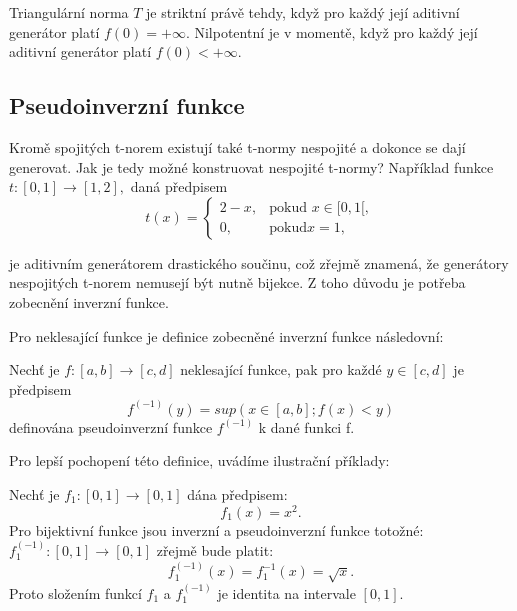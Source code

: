 \begin{remark}
    Triangul\'arn\'i norma $T$ je striktní právě tehdy, když pro každý její aditivní generátor platí $f(0) = +\infty$. Nilpotentní je v momentě, když pro každý její aditivní generátor platí $f(0) < +\infty$.
\end{remark}
\subsection{Pseudoinverzn\'i funkce}

Krom\v e   spojit\'ych t-norem existuj\'i tak\'e t-normy nespojit\'e a dokonce se daj\'i generovat. Jak je tedy možné konstruovat nespojité t-normy? Například funkce $t: [0,1] \rightarrow [1,2],$ daná předpisem $$t(x)= \begin{cases} 2-x, & \mbox {pokud }x \in [0,1[,
    \\ 0, & \mbox {pokud} x = 1,
    \end{cases}$$
    
    je aditivním generátorem drastického součinu, což zřejmě znamená, že generátory nespojitých t-norem nemusejí být nutně bijekce. Z toho d\r uvodu je potřeba zobecnění inverzní funkce.

      Pro neklesající  funkce je definice zobecn\v en\'e inverzn\'i funkce n\'asledovn\'i:
\begin{definition}
    \cite{hlinena}
    Nech\v t je $f:[a,b] \rightarrow [c,d]$ neklesající funkce, pak pro každé $y \in [c,d]$ je předpisem $$f^{(-1)}(y) = sup(x \in [a,b];f(x)<y)$$
    definována pseudoinverzní funkce $f^{(-1)}$ k dané funkci f.
\end{definition}

Pro lep\v s\'i pochopen\'i t\'eto definice, uv\'ad\'ime ilustra\v cn\'i p\v r\'iklady:

\begin{example} 
    Nech\v t je  $f_1:[0,1] \rightarrow [0,1]$  dána předpisem:
    $$f_1(x)=x^2.$$
   Pro bijektivn\'i funkce jsou inverzn\'i a pseudoinverzn\'i funkce toto\v zn\'e: \newline$f_1^{(-1)}:[0,1] \rightarrow [0,1]$ zřejmě bude platit:
    $$f_1^{(-1)}(x)=f_1^{-1}(x)= \sqrt{x}.$$
    Proto složením funkcí $f_1$ a $f_1^{(-1)}$ je
    identita na intervale $[0,1].$
\end{example} 

